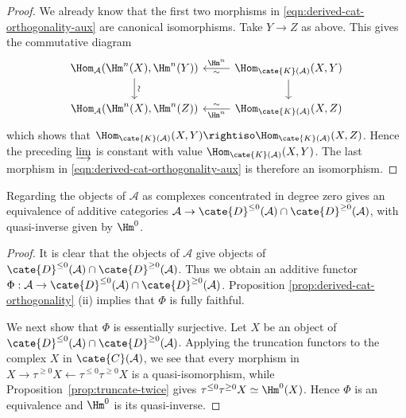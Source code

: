 \begin{proof}
	We already know that the first two morphisms in
	\eqref{eqn:derived-cat-orthogonality-aux} are canonical isomorphisms. Take
	$Y\to Z$ as above. This gives the commutative diagram
	\[\begin{tikzcd}
		\Hom_{\mathcal{A}}(\Hm^n(X), \Hm^n(Y)) \arrow[d, "\sim" sloped] & \Hom_{\cate{K}(\mathcal{A})}(X, Y) \arrow[l, "\sim", "{\Hm^n}"'] \arrow[d] \\
		\Hom_{\mathcal{A}}(\Hm^n(X), \Hm^n(Z)) & \Hom_{\cate{K}(\mathcal{A})}(X, Z) \arrow[l, "\sim"', "{\Hm^n}"]
	\end{tikzcd}\]
	which shows that
	$\Hom_{\cate{K}(\mathcal{A})}(X,Y)\rightiso
	\Hom_{\cate{K}(\mathcal{A})}(X,Z)$. Hence the preceding $\varinjlim$ is
	constant with value $\Hom_{\cate{K}(\mathcal{A})}(X,Y)$. The last
	morphism in \eqref{eqn:derived-cat-orthogonality-aux} is therefore an
	isomorphism.
\end{proof}

\begin{theorem}\label{prop:derived-cat-embedding}
	Regarding the objects of $\mathcal{A}$ as complexes concentrated in
	degree zero gives an equivalence of additive categories
	$\mathcal{A}\to\cate{D}^{\leq0}(\mathcal{A})\cap
	\cate{D}^{\geq0}(\mathcal{A})$, with quasi-inverse given by $\Hm^0$.
\end{theorem}

\begin{proof}
	It is clear that the objects of $\mathcal{A}$ give objects of
	$\cate{D}^{\leq0}(\mathcal{A})\cap\cate{D}^{\geq0}(\mathcal{A})$.
	Thus we obtain an additive functor
	$\Phi:\mathcal{A}\to\cate{D}^{\leq0}(\mathcal{A})\cap
	\cate{D}^{\geq0}(\mathcal{A})$. Proposition
	\ref{prop:derived-cat-orthogonality} (ii) implies that $\Phi$ is fully
	faithful.

	We next show that $\Phi$ is essentially surjective. Let $X$ be an object
	of $\cate{D}^{\leq0}(\mathcal{A})\cap\cate{D}^{\geq0}(\mathcal{A})$.
	Applying the truncation functors to the complex $X$ in
	$\cate{C}(\mathcal{A})$, we see that every morphism in
	$X\to\tau^{\geq0}X\leftarrow\tau^{\leq0}\tau^{\geq0}X$ is a
	quasi-isomorphism, while Proposition~\ref{prop:truncate-twice} gives
	$\tau^{\leq0}\tau^{\geq0}X\simeq\Hm^0(X)$. Hence $\Phi$ is an
	equivalence and $\Hm^0$ is its quasi-inverse.
\end{proof}

